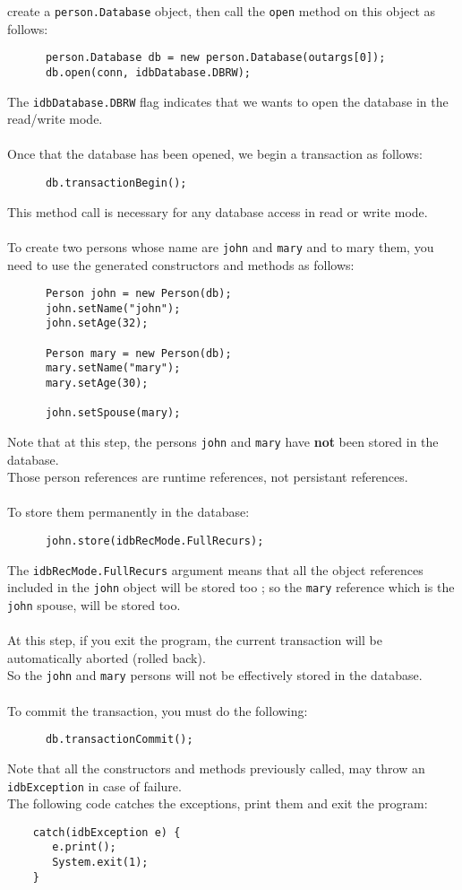 create a \texttt{person.Database} object, then call the \texttt{open}
method on this object as follows:
{\verbsize \begin{verbatim}
      person.Database db = new person.Database(outargs[0]);
      db.open(conn, idbDatabase.DBRW);
\end{verbatim}
}
The \texttt{idbDatabase.DBRW} flag indicates that we wants to open
the database in the read/write mode.
\\
\\
Once that the database has been opened, we begin a transaction as follows:
{\verbsize \begin{verbatim}
      db.transactionBegin();
\end{verbatim}
}
This method call is necessary for any database access in read or write
mode.
\\
\\
To create two persons whose name are \texttt{john} and \texttt{mary} and
to mary them, you need to use the generated constructors and methods
as follows:
{\verbsize \begin{verbatim}
      Person john = new Person(db);
      john.setName("john");
      john.setAge(32);
     
      Person mary = new Person(db);
      mary.setName("mary");
      mary.setAge(30);
     
      john.setSpouse(mary);
\end{verbatim}
}
Note that at this step, the persons \texttt{john} and \texttt{mary} have
{\bf not} been stored in the database.
\\
Those person references are runtime references, not persistant references.
\\
\\
To store them permanently in the database:
{\verbsize \begin{verbatim}
      john.store(idbRecMode.FullRecurs);
\end{verbatim}
}
The \texttt{idbRecMode.FullRecurs} argument means that all the object
references included in the \texttt{john} object will be stored too ; so
the \texttt{mary} reference which is the \texttt{john} spouse, will be stored too.
\\
\\
At this step, if you exit the program, the current transaction will
be automatically aborted (rolled back).
\\
So the \texttt{john} and \texttt{mary} persons will not be effectively stored
in the database.
\\
\\
To commit the transaction, you must do the following:
{\verbsize \begin{verbatim}
      db.transactionCommit();
\end{verbatim}
}
Note that all the constructors and methods previously called, may
throw an \texttt{idbException} in case of failure.
\\
The following code catches the exceptions, print them and exit the program:
{\verbsize \begin{verbatim}
    catch(idbException e) {
       e.print();
       System.exit(1);
    }
\end{verbatim}
}

